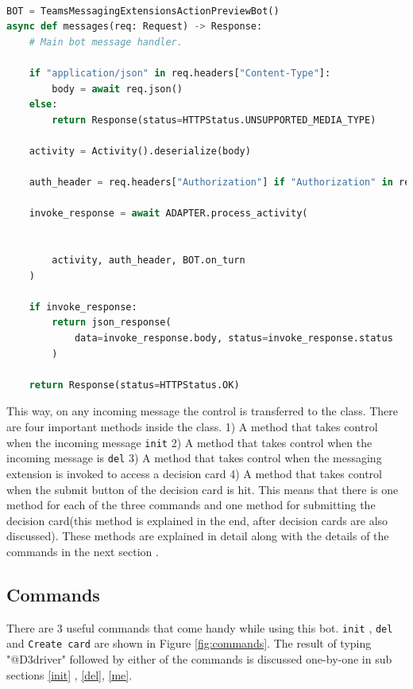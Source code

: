 \begin{lstlisting}[caption={app.py},label={lst:app.py},language=python]

BOT = TeamsMessagingExtensionsActionPreviewBot()
async def messages(req: Request) -> Response:
    # Main bot message handler.

    if "application/json" in req.headers["Content-Type"]:
        body = await req.json()
    else:
        return Response(status=HTTPStatus.UNSUPPORTED_MEDIA_TYPE)

    activity = Activity().deserialize(body)

    auth_header = req.headers["Authorization"] if "Authorization" in req.headers else ""

    invoke_response = await ADAPTER.process_activity(


        activity, auth_header, BOT.on_turn
    )

    if invoke_response:
        return json_response(
            data=invoke_response.body, status=invoke_response.status
        )

    return Response(status=HTTPStatus.OK)
\end{lstlisting}

This way, on any incoming message the control is transferred to the class. There are four important methods inside the class. 1) A method that takes control when the incoming message \texttt{init} 2) A method that takes control when the incoming message is \texttt{del} 3) A method that takes control when the messaging extension is invoked to access a decision card 4) A method that takes control when the submit button of the decision card is hit. This means that there is one method for each of the three commands and one method for submitting the decision card(this method is explained in the end, after decision cards are also discussed). These methods are explained in detail along with the details of the commands in the next section .
\subsection{Commands}
 There are 3 useful commands that come handy while using this bot. \texttt{init} , \texttt{del} and \texttt{Create card} are shown in Figure \ref{fig:commands}. The result of typing "@D3driver" followed by either of the commands is discussed one-by-one in sub sections \ref{init} , \ref{del}, \ref{me}.



